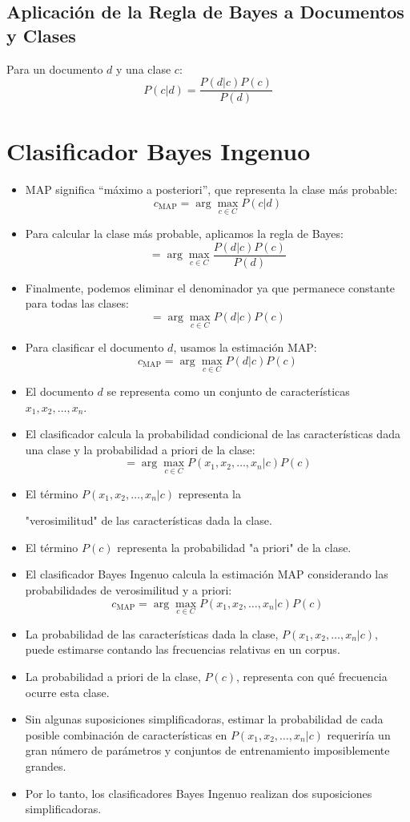 \documentclass[11pt,fleqn]{book} %
\begin{document}
\subsection{Aplicación de la Regla de Bayes a Documentos y Clases}
Para un documento $d$ y una clase $c$:
\[
P(c | d) = \frac{P(d | c)P(c)}{P(d)}
\]


\section{Clasificador Bayes Ingenuo}
\begin{itemize}
    \item MAP significa ``máximo a posteriori'', que representa la clase más probable:
    \[
    c_{\text{MAP}} = \arg\max_{c \in C} P(c | d)
    \]
    \item Para calcular la clase más probable, aplicamos la regla de Bayes:
    \[
    = \arg\max_{c \in C} \frac{P(d | c)P(c)}{P(d)}
    \]
    \item Finalmente, podemos eliminar el denominador ya que permanece constante para todas las clases:
    \[
    = \arg\max_{c \in C} P(d | c)P(c)
    \]
    \item Para clasificar el documento $d$, usamos la estimación MAP:
    \[
    c_{\text{MAP}} = \arg\max_{c \in C} P(d | c)P(c)
    \]
    \item El documento $d$ se representa como un conjunto de características $x_1, x_2, \ldots, x_n$.
    \item El clasificador calcula la probabilidad condicional de las características dada una clase y la probabilidad a priori de la clase:
    \[
    = \arg\max_{c \in C} P(x_1, x_2, \ldots, x_n | c)P(c)
    \]
    \item El término $P(x_1, x_2, \ldots, x_n | c)$ representa la

 "verosimilitud" de las características dada la clase.
    \item El término $P(c)$ representa la probabilidad "a priori" de la clase.
    \item El clasificador Bayes Ingenuo \cite{mccallum1998comparison} calcula la estimación MAP considerando las probabilidades de verosimilitud y a priori:
    \[
    c_{\text{MAP}} = \arg\max_{c \in C} P(x_1, x_2, \ldots, x_n | c)P(c)
    \]
    \item La probabilidad de las características dada la clase, $P(x_1, x_2, \ldots, x_n | c)$, puede estimarse contando las frecuencias relativas en un corpus.
    \item La probabilidad a priori de la clase, $P(c)$, representa con qué frecuencia ocurre esta clase.
    \item Sin algunas suposiciones simplificadoras, estimar la probabilidad de cada posible combinación de características en $P(x_1, x_2, \ldots, x_n | c)$ requeriría un gran número de parámetros y conjuntos de entrenamiento imposiblemente grandes.
    \item Por lo tanto, los clasificadores Bayes Ingenuo realizan dos suposiciones simplificadoras.
\end{itemize}
\end{document}
